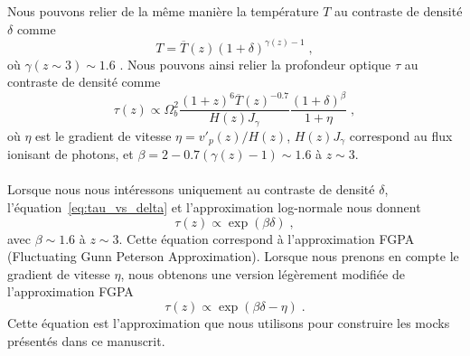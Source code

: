 Nous pouvons relier de la même manière la température $T$ au contraste de densité $\delta$ comme
\begin{equation}
  T = \overline T(z)(1+\delta)^{\gamma(z) -1 } \; ,
\end{equation}
où $\gamma (z \sim 3) \sim \num{1.6}$ \autocite{Hui1996}.
Nous pouvons ainsi relier la profondeur optique $\tau$ au contraste de densité comme
\begin{equation}
  \label{eq:tau_vs_delta}
  \tau(z) \propto  \Omega_b^2 \frac{(1+z)^6 \overline T(z)^{-\num{0.7}}}{H(z)J_{\gamma}}
  \frac{(1+\delta)^{\beta}}{1+\eta} \; ,
\end{equation}
où $\eta$ est le gradient de vitesse $\eta = v'_{p}(z) / H(z)$, $H(z)J_{\gamma}$ correspond au flux ionisant de photons, et $\beta = 2 - \num{0.7}(\gamma(z) -1) \sim \num{1.6}$ à $z \sim 3$.

\paragraph{}
Lorsque nous nous intéressons uniquement au contraste de densité $\delta$, l'équation~\ref{eq:tau_vs_delta} et l'approximation log-normale \autocite{coles_lognormal_1991} nous donnent 
\begin{equation}
\tau(z) \propto \exp(\beta \delta) \; ,
\end{equation}
avec $\beta \sim \num{1.6}$ à $z \sim 3$.
Cette équation correspond à l'approximation FGPA (Fluctuating Gunn Peterson Approximation).
Lorsque nous prenons en compte le gradient de vitesse $\eta$, nous obtenons une version légèrement modifiée de l'approximation FGPA
\begin{equation}
\tau(z) \propto \exp(\beta \delta - \eta) \; .
\end{equation}
Cette équation est l'approximation que nous utilisons pour construire les mocks présentés dans ce manuscrit.


% 
